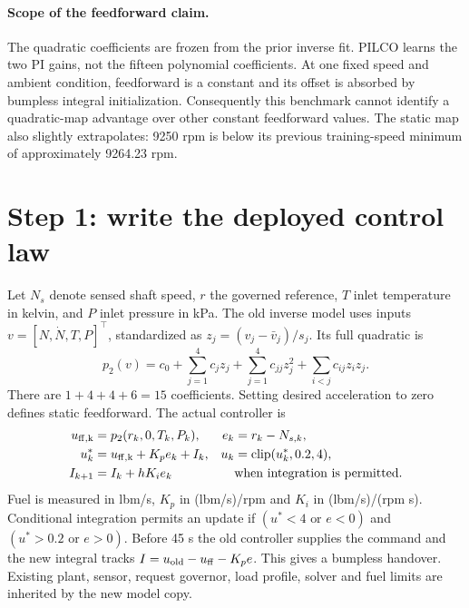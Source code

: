 \paragraph{Scope of the feedforward claim.} The quadratic coefficients are frozen from the prior inverse fit. PILCO learns the two PI gains, not the fifteen polynomial coefficients. At one fixed speed and ambient condition, feedforward is a constant and its offset is absorbed by bumpless integral initialization. Consequently this benchmark cannot identify a quadratic-map advantage over other constant feedforward values. The static map also slightly extrapolates: 9250 rpm is below its previous training-speed minimum of approximately 9264.23 rpm.

\section{Step 1: write the deployed control law}
Let $N_s$ denote sensed shaft speed, $r$ the governed reference, $T$ inlet temperature in kelvin, and $P$ inlet pressure in kPa. The old inverse model uses inputs $v=[N,\dot N,T,P]^\top$, standardized as $z_j=(v_j-\bar v_j)/s_j$. Its full quadratic is
\begin{equation}
 p_2(v)=c_0+\sum_{j=1}^4c_jz_j+\sum_{j=1}^4c_{jj}z_j^2+\sum_{i<j}c_{ij}z_iz_j.
\end{equation}
There are $1+4+4+6=15$ coefficients. Setting desired acceleration to zero defines static feedforward. The actual controller is
\begin{align}
 u_{\rm ff,k}&=p_2(r_k,0,T_k,P_k), &e_k&=r_k-N_{s,k},\\
 u_k^*&=u_{\rm ff,k}+K_pe_k+I_k, &u_k&=\operatorname{clip}(u_k^*,0.2,4),\\
 I_{k+1}&=I_k+hK_ie_k &&\text{when integration is permitted.}
\end{align}
Fuel is measured in lbm/s, $K_p$ in (lbm/s)/rpm and $K_i$ in (lbm/s)/(rpm s). Conditional integration permits an update if $(u^*<4\text{ or }e<0)$ and $(u^*>0.2\text{ or }e>0)$. Before 45 s the old controller supplies the command and the new integral tracks $I=u_{\rm old}-u_{\rm ff}-K_pe$. This gives a bumpless handover. Existing plant, sensor, request governor, load profile, solver and fuel limits are inherited by the new model copy.

